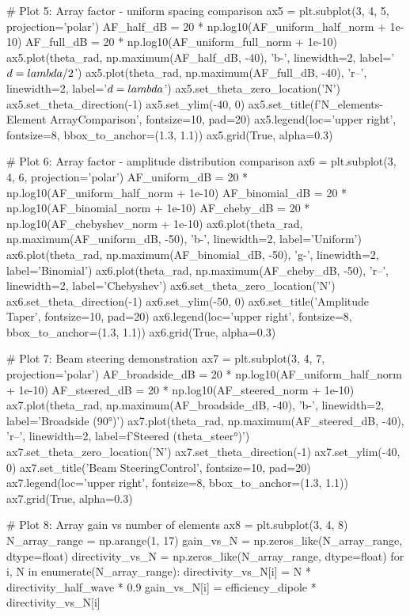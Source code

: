 \documentclass[a4paper, 11pt]{article}
\begin{document}
\begin{pycode}
# Plot 5: Array factor - uniform spacing comparison
ax5 = plt.subplot(3, 4, 5, projection='polar')
AF_half_dB = 20 * np.log10(AF_uniform_half_norm + 1e-10)
AF_full_dB = 20 * np.log10(AF_uniform_full_norm + 1e-10)
ax5.plot(theta_rad, np.maximum(AF_half_dB, -40), 'b-', linewidth=2, label='$d = \\lambda/2$')
ax5.plot(theta_rad, np.maximum(AF_full_dB, -40), 'r--', linewidth=2, label='$d = \\lambda$')
ax5.set_theta_zero_location('N')
ax5.set_theta_direction(-1)
ax5.set_ylim(-40, 0)
ax5.set_title(f'{N_elements}-Element Array\nSpacing Comparison', fontsize=10, pad=20)
ax5.legend(loc='upper right', fontsize=8, bbox_to_anchor=(1.3, 1.1))
ax5.grid(True, alpha=0.3)

# Plot 6: Array factor - amplitude distribution comparison
ax6 = plt.subplot(3, 4, 6, projection='polar')
AF_uniform_dB = 20 * np.log10(AF_uniform_half_norm + 1e-10)
AF_binomial_dB = 20 * np.log10(AF_binomial_norm + 1e-10)
AF_cheby_dB = 20 * np.log10(AF_chebyshev_norm + 1e-10)
ax6.plot(theta_rad, np.maximum(AF_uniform_dB, -50), 'b-', linewidth=2, label='Uniform')
ax6.plot(theta_rad, np.maximum(AF_binomial_dB, -50), 'g-', linewidth=2, label='Binomial')
ax6.plot(theta_rad, np.maximum(AF_cheby_dB, -50), 'r--', linewidth=2, label='Chebyshev')
ax6.set_theta_zero_location('N')
ax6.set_theta_direction(-1)
ax6.set_ylim(-50, 0)
ax6.set_title('Amplitude Taper\nComparison', fontsize=10, pad=20)
ax6.legend(loc='upper right', fontsize=8, bbox_to_anchor=(1.3, 1.1))
ax6.grid(True, alpha=0.3)

# Plot 7: Beam steering demonstration
ax7 = plt.subplot(3, 4, 7, projection='polar')
AF_broadside_dB = 20 * np.log10(AF_uniform_half_norm + 1e-10)
AF_steered_dB = 20 * np.log10(AF_steered_norm + 1e-10)
ax7.plot(theta_rad, np.maximum(AF_broadside_dB, -40), 'b-', linewidth=2, label='Broadside (90°)')
ax7.plot(theta_rad, np.maximum(AF_steered_dB, -40), 'r--', linewidth=2, label=f'Steered ({theta_steer}°)')
ax7.set_theta_zero_location('N')
ax7.set_theta_direction(-1)
ax7.set_ylim(-40, 0)
ax7.set_title('Beam Steering\nPhase Control', fontsize=10, pad=20)
ax7.legend(loc='upper right', fontsize=8, bbox_to_anchor=(1.3, 1.1))
ax7.grid(True, alpha=0.3)

# Plot 8: Array gain vs number of elements
ax8 = plt.subplot(3, 4, 8)
N_array_range = np.arange(1, 17)
gain_vs_N = np.zeros_like(N_array_range, dtype=float)
directivity_vs_N = np.zeros_like(N_array_range, dtype=float)
for i, N in enumerate(N_array_range):
    directivity_vs_N[i] = N * directivity_half_wave * 0.9
    gain_vs_N[i] = efficiency_dipole * directivity_vs_N[i]


\end{pycode}
\end{document}
